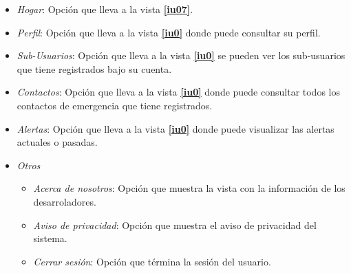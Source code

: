  \begin{itemize}
   \item \textit{Hogar}: Opción que lleva a la vista \textbf{\ref{iu07}}.
   \item \textit{Perfil}: Opción que lleva a la vista \textbf{\ref{iu0}} donde puede consultar su perfil.
   \item \textit{Sub-Usuarios}:  Opción que lleva a la vista \textbf{\ref{iu0}} se pueden ver los sub-usuarios que tiene registrados bajo su cuenta.
   \item \textit{Contactos}:  Opción que lleva a la vista \textbf{\ref{iu0}} donde puede consultar todos los contactos de emergencia que tiene registrados.
   \item \textit{Alertas}:  Opción que lleva a la vista \textbf{\ref{iu0}} donde puede visualizar las alertas actuales o pasadas.
   \item \textit{Otros}
     \begin{itemize}
       \item \textit{Acerca de nosotros}:  Opción que muestra la vista con la información de los desarroladores.
       \item \textit{Aviso de privacidad}:  Opción que muestra el aviso de privacidad del sistema.
       \item \textit{Cerrar sesión}:  Opción que términa la sesión del usuario.
     \end{itemize}
 \end{itemize}